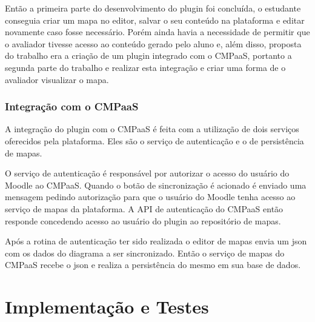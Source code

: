 \documentclass[
	12pt,				%
	openright,			%
	oneside,			%
	a4paper,			%
	english,			%
	french,				%
	spanish,			%
	brazil				%
	]{abntex2}
\begin{document}
Então a primeira parte do desenvolvimento do plugin foi concluída, o estudante conseguia criar um mapa no editor, salvar o seu conteúdo na plataforma e editar novamente caso fosse necessário. Porém ainda havia a necessidade de permitir que o avaliador tivesse acesso ao conteúdo gerado pelo aluno e, além disso, proposta do trabalho era a criação de um plugin integrado com o CMPaaS,  portanto a segunda parte do trabalho e realizar esta integração e criar uma forma de o avaliador visualizar o mapa.

\subsection{Integração com o CMPaaS}

A integração do plugin com o CMPaaS é feita com a utilização de dois serviços oferecidos pela plataforma. Eles são o serviço de autenticação e o de persistência de mapas.

O serviço de autenticação é responsável por autorizar o acesso do usuário do Moodle ao CMPaaS. Quando o botão de sincronização é acionado é enviado uma mensagem pedindo autorização para que o usuário do Moodle tenha acesso ao serviço de mapas da plataforma. A API de autenticação do CMPaaS então responde concedendo acesso ao usuário do plugin ao repositório de mapas.

Após a rotina de autenticação ter sido realizada o editor de mapas envia um json com os dados do diagrama a ser sincronizado. Então o serviço de mapas do CMPaaS recebe o json e realiza a persistência do mesmo em sua base de dados.



\chapter{Implementação e Testes}
\end{document}
